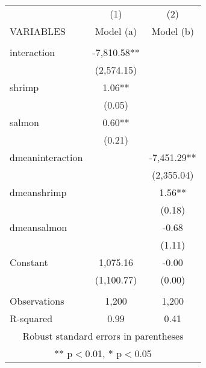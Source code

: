 \begin{tabular}{lcc} \hline
 & (1) & (2) \\
VARIABLES & Model (a) & Model (b) \\ \hline
 &  &  \\
interaction & -7,810.58** &  \\
 & (2,574.15) &  \\
shrimp & 1.06** &  \\
 & (0.05) &  \\
salmon & 0.60** &  \\
 & (0.21) &  \\
dmeaninteraction &  & -7,451.29** \\
 &  & (2,355.04) \\
dmeanshrimp &  & 1.56** \\
 &  & (0.18) \\
dmeansalmon &  & -0.68 \\
 &  & (1.11) \\
Constant & 1,075.16 & -0.00 \\
 & (1,100.77) & (0.00) \\
 &  &  \\
Observations & 1,200 & 1,200 \\
 R-squared & 0.99 & 0.41 \\ \hline
\multicolumn{3}{c}{ Robust standard errors in parentheses} \\
\multicolumn{3}{c}{ ** p$<$0.01, * p$<$0.05} \\
\end{tabular}
